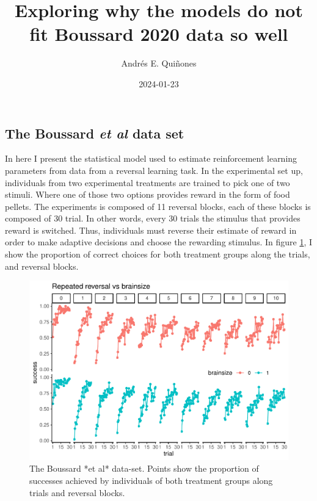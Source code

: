 \documentclass[
]{article}
\title{Exploring why the models do not fit Boussard 2020 data so well}
\author{Andrés E. Quiñones}
\date{2024-01-23}
\begin{document}
\maketitle

\hypertarget{the-boussard-et-al-data-set}{%
\subsection{\texorpdfstring{The Boussard \emph{et al} data
set}{The Boussard et al data set}}\label{the-boussard-et-al-data-set}}

In here I present the statistical model used to estimate reinforcement
learning parameters from data from a reversal learning task. In the
experimental set up, individuals from two experimental treatments are
trained to pick one of two stimuli. Where one of those two options
provides reward in the form of food pellets. The experiments is composed
of 11 reversal blocks, each of these blocks is composed of 30 trial. In
other words, every 30 trials the stimulus that provides reward is
switched. Thus, individuals must reverse their estimate of reward in
order to make adaptive decisions and choose the rewarding stimulus. In
figure \ref{fig:plotBoussard}, I show the proportion of correct choices
for both treatment groups along the trials, and reversal blocks.

\begin{figure}

\includegraphics{report_boussard2020_files/figure-latex/plotBoussard-1} \hfill{}

\caption{The Boussard *et al* data-set. Points show the proportion of successes achieved by individuals of both treatment groups along trials and reversal blocks.}\label{fig:plotBoussard}
\end{figure}
\end{document}
